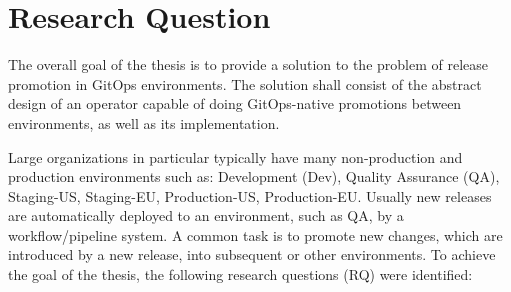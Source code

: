 \chapter{Research Question}















%

The overall goal of the thesis is to
provide a solution to the problem of release promotion in GitOps environments.
The solution shall consist of the abstract design of an operator capable of doing
GitOps-native promotions between environments, as well as its implementation.

Large organizations in particular typically have many
non-production and production environments
such as:
Development (Dev),
Quality Assurance (QA),
Staging-US,
Staging-EU,
Production-US,
Production-EU.
Usually new releases are automatically deployed to an environment,
such as QA, 
by a workflow/pipeline system.
A common task is to promote
new changes, which are introduced by a new release,
into subsequent or other environments.
%
%
%
To achieve the goal of the thesis, the following research questions (RQ) were identified:

